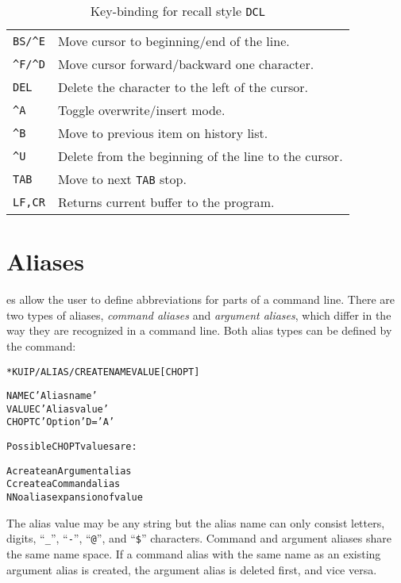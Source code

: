 \begin{table}\centering
\begin{tabular}{|l|l|}
\hline
\verb!BS/^E! & Move cursor to beginning/end of the line. \\
\verb!^F/^D! & Move cursor forward/backward one character. \\
\verb!DEL!   & Delete the character to the left of the cursor. \\
\verb!^A!    & Toggle overwrite/insert mode. \\
\verb!^B!    & Move to previous item on history list. \\
\verb!^U!    & Delete from the beginning of the line to the cursor. \\
\verb!TAB!   & Move to next \texttt{TAB} stop. \\
\verb!LF,CR! & Returns current buffer to the program. \\
\hline
\end{tabular}
\caption{Key-binding for recall style {\tt DCL}
\label{tab-recall-dcl}}
\end{table}

%
%
\section{Aliases}

es allow the user to define abbreviations for parts of a
command line.
There are two types of aliases,
\emph{command aliases} and \emph{argument aliases}, which differ
in the way they are recognized in a command line.
Both alias types can be defined by the  command:
\begin{alltt}
 * KUIP/ALIAS/CREATE NAME VALUE [ CHOPT ]

   NAME       C 'Alias name'
   VALUE      C 'Alias value'
   CHOPT      C 'Option' D='A'

   Possible CHOPT values are:

    A  create an Argument alias
    C  create a Command alias
    N  No alias expansion of value
\end{alltt}

The alias value may be any string but the alias name can only consist
letters, digits, ``\verb!_!'', ``\texttt{-}'', ``\texttt{@}'',
and ``\verb!$!'' characters.
Command and argument aliases share the same name space. 
If a command alias with the same name as an existing argument alias is
created, the argument alias is deleted first, and vice versa.


